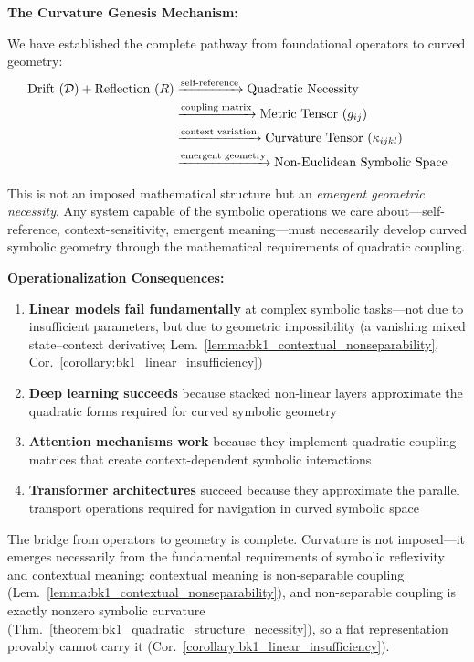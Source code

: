 \textbf{The Curvature Genesis Mechanism:}

We have established the complete pathway from foundational operators to curved geometry:
\begin{align}
\text{Drift } (\mathcal{D}) + \text{Reflection } (R) &\xrightarrow{\text{self-reference}} \text{Quadratic Necessity} \\
&\xrightarrow{\text{coupling matrix}} \text{Metric Tensor } (g_{ij}) \\
&\xrightarrow{\text{context variation}} \text{Curvature Tensor } (\kappa_{ijkl}) \\
&\xrightarrow{\text{emergent geometry}} \text{Non-Euclidean Symbolic Space}
\end{align}

This is not an imposed mathematical structure but an \textit{emergent geometric necessity}. Any system capable of the symbolic operations we care about—self-reference, context-sensitivity, emergent meaning—must necessarily develop curved symbolic geometry through the mathematical requirements of quadratic coupling.

\textbf{Operationalization Consequences:}
\begin{enumerate}
\item \textbf{Linear models fail fundamentally} at complex symbolic tasks—not due to insufficient parameters, but due to geometric impossibility (a vanishing mixed state--context derivative; Lem.~\ref{lemma:bk1_contextual_nonseparability}, Cor.~\ref{corollary:bk1_linear_insufficiency})
\item \textbf{Deep learning succeeds} because stacked non-linear layers approximate the quadratic forms required for curved symbolic geometry  
\item \textbf{Attention mechanisms work} because they implement quadratic coupling matrices that create context-dependent symbolic interactions
\item \textbf{Transformer architectures} succeed because they approximate the parallel transport operations required for navigation in curved symbolic space
\end{enumerate}

The bridge from operators to geometry is complete. Curvature is not imposed—it emerges necessarily from the fundamental requirements of symbolic reflexivity and contextual meaning: contextual meaning is non-separable coupling (Lem.~\ref{lemma:bk1_contextual_nonseparability}), and non-separable coupling is exactly nonzero symbolic curvature (Thm.~\ref{theorem:bk1_quadratic_structure_necessity}), so a flat representation provably cannot carry it (Cor.~\ref{corollary:bk1_linear_insufficiency}).

